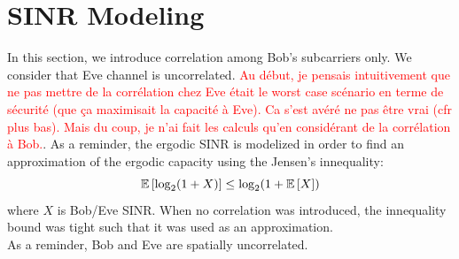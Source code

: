 \documentclass[12pt]{article}
\begin{document}
\section{SINR Modeling}
In this section, we introduce correlation among Bob's subcarriers only. We consider that Eve channel is uncorrelated. \textcolor{red}{Au début, je pensais intuitivement que ne pas mettre de la corrélation chez Eve était le worst case scénario en terme de sécurité (que ça maximisait la capacité à Eve). Ca s'est avéré ne pas être vrai (cfr plus bas). Mais du coup, je n'ai fait les calculs qu'en considérant de la corrélation à Bob.}. As a reminder, the ergodic SINR is modelized in order to find an approximation of the ergodic capacity using the Jensen's innequality:
\begin{equation}
	\mathbb{E} \left[\log_2(1+X)\right] \leq \log_2(1+\mathbb{E} \left[X\right]) 
	\label{eq:jensen_innequality}
\end{equation}
where $X$ is Bob/Eve SINR. When no correlation was introduced, the innequality bound was tight such that it was used as an approximation. \\
As a reminder, Bob and Eve are spatially uncorrelated. 
\end{document}
